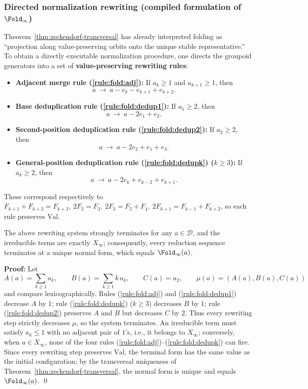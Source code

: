 \subsubsection{Directed normalization rewriting (compiled formulation of \texorpdfstring{$\Fold_\infty$}{Fold\_infty})}\label{subsec:directed-rewrite}
Theorem~\ref{thm:zeckendorf-transversal} has already interpreted folding as ``projection along value-preserving orbits onto the unique stable representative.'' To obtain a directly executable normalization procedure, one directs the groupoid generators into a set of \textbf{value-preserving rewriting rules}:
\begin{itemize}
  \item \textbf{Adjacent merge rule (\ref{rule:fold:adj}):} If $a_k\ge 1$ and $a_{k+1}\ge 1$, then
  \[
  a\ \to\ a-e_k-e_{k+1}+e_{k+2}.
  \]
  \item \textbf{Base deduplication rule (\ref{rule:fold:dedup1}):} If $a_1\ge 2$, then
  \[
  a\ \to\ a-2e_1+e_2.
  \]
  \item \textbf{Second-position deduplication rule (\ref{rule:fold:dedup2}):} If $a_2\ge 2$, then
  \[
  a\ \to\ a-2e_2+e_1+e_3.
  \]
  \item \textbf{General-position deduplication rule (\ref{rule:fold:dedupk}) ($k\ge 3$):} If $a_k\ge 2$, then
  \[
  a\ \to\ a-2e_k+e_{k-2}+e_{k+1}.
  \]
\end{itemize}
These correspond respectively to
\(
F_{k+1}+F_{k+2}=F_{k+3},\
2F_2=F_3,\
2F_3=F_2+F_4,\
2F_{k+1}=F_{k-1}+F_{k+2}
\),
so each rule preserves $\mathrm{Val}$.

\begin{proposition}\label{prop:directed-rewrite-termination}
The above rewriting system strongly terminates for any $a\in\mathcal{D}$, and the irreducible terms are exactly $X_\infty$; consequently, every reduction sequence terminates at a unique normal form, which equals $\Fold_\infty(a)$.
\end{proposition}

\textbf{Proof:}
Let
\[
A(a)=\sum_{k\ge 1} a_k,\qquad
B(a)=\sum_{k\ge 1} k\,a_k,\qquad
C(a)=a_2,
\qquad
\mu(a)=(A(a),B(a),C(a))
\]
and compare lexicographically. Rules (\ref{rule:fold:adj}) and (\ref{rule:fold:dedup1}) decrease $A$ by $1$; rule (\ref{rule:fold:dedupk}) ($k\ge 3$) decreases $B$ by $1$; rule (\ref{rule:fold:dedup2}) preserves $A$ and $B$ but decreases $C$ by $2$. Thus every rewriting step strictly decreases $\mu$, so the system terminates. An irreducible term must satisfy $a_k\le 1$ with no adjacent pair of $1$'s, i.e., it belongs to $X_\infty$; conversely, when $a\in X_\infty$, none of the four rules (\ref{rule:fold:adj})--(\ref{rule:fold:dedupk}) can fire. Since every rewriting step preserves $\mathrm{Val}$, the terminal form has the same value as the initial configuration; by the transversal uniqueness of Theorem~\ref{thm:zeckendorf-transversal}, the normal form is unique and equals $\Fold_\infty(a)$. \qed

